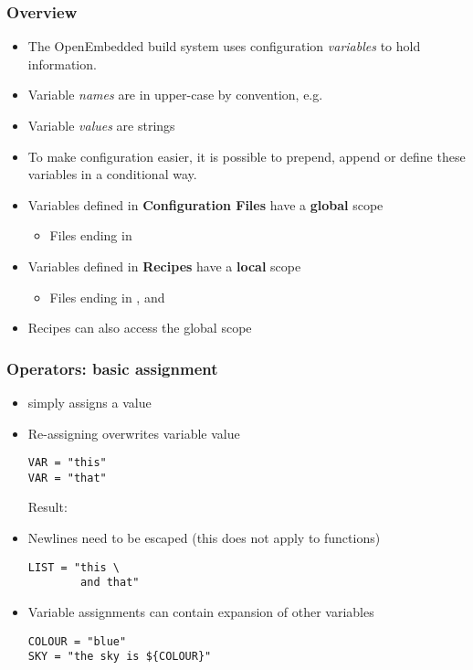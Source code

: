 \begin{frame}
  \frametitle{Overview}
  \begin{itemize}
    \item The OpenEmbedded build system uses configuration {\em variables}
      to hold information.
    \item Variable {\em names} are in upper-case by convention, e.g.
    \item Variable {\em values} are strings
    \item To make configuration easier, it is possible to prepend,
      append or define these variables in a conditional way.
    \item Variables defined in \textbf{Configuration Files} have a \textbf{global} scope
      \begin{itemize}
      \item Files ending in 
      \end{itemize}
    \item Variables defined in \textbf{Recipes} have a \textbf{local} scope
      \begin{itemize}
      \item Files ending in ,  and 
      \end{itemize}
    \item Recipes can also access the global scope
  \end{itemize}
\end{frame}

\begin{frame}[fragile]
  \frametitle{Operators: basic assignment}
  \begin{itemize}
  \item {} simply assigns a value
  \item Re-assigning overwrites variable value
    \begin{block}{}
      \begin{verbatim}
VAR = "this"
VAR = "that"
      \end{verbatim}
    \end{block}
    Result: 
  \item Newlines need to be escaped (this does not apply to functions)
    \begin{block}{}
      \begin{verbatim}
LIST = "this \
        and that"
      \end{verbatim}
    \end{block}
  \item Variable assignments can contain expansion of other variables
    \begin{block}{}
      \begin{verbatim}
COLOUR = "blue"
SKY = "the sky is ${COLOUR}"
      \end{verbatim}
    \end{block}
  \end{itemize}
\end{frame}

